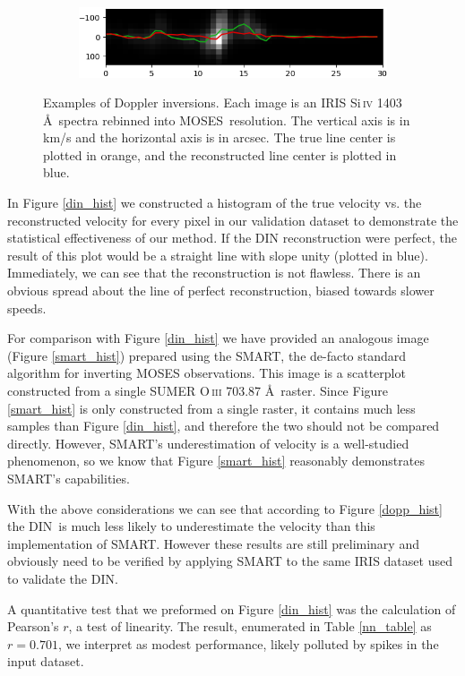 \documentclass[10pt,letterpaper]{article}
\newcommand{\SiIV}{Si\,\textsc{iv} 1403 \AA}
\newcommand{\MOSES}{\ac{MOSES}}
\newcommand{\SMART}{\ac{SMART}}
\newcommand{\DIN}{\ac{DIN}}
\begin{document}
\begin{figure}[h!]
\begin{subfigure}[t]{0.49\textwidth}
						\centering
						\includegraphics[width=\textwidth]{fig/doppler_1343}
					\end{subfigure}
					\caption{Examples of Doppler inversions. Each image is an IRIS \SiIV\ spectra rebinned into \MOSES\ resolution. The vertical axis is in km/s and the horizontal axis is in arcsec. The true line center is plotted in orange, and the reconstructed line center is plotted in blue.}
					\label{dopp_ex}
				\end{figure}

				In Figure \ref{din_hist} we constructed a histogram of the true velocity vs. the reconstructed velocity for every pixel in our validation dataset to demonstrate the statistical effectiveness of our method.
				If the DIN reconstruction were perfect, the result of this plot would be a straight line with slope unity (plotted in blue).
				Immediately, we can see that the reconstruction is not flawless. 
				There is an obvious spread about the line of perfect reconstruction, biased towards slower speeds.
				
				For comparison with Figure \ref{din_hist} we have provided an analogous image (Figure \ref{smart_hist}) prepared using the \SMART, the de-facto standard algorithm for inverting MOSES observations.
				This image is a scatterplot constructed from a single SUMER O\,\textsc{iii} 703.87 \AA\ raster.
				Since Figure \ref{smart_hist} is only constructed from a single raster, it contains much less samples than Figure \ref{din_hist}, and therefore the two should not be compared directly.
				However, SMART's underestimation of velocity is a well-studied phenomenon, so we know that Figure \ref{smart_hist} reasonably demonstrates SMART's capabilities.
				
				With the above considerations we can see that according to Figure \ref{dopp_hist} the \DIN\ is much less likely to underestimate the velocity than this implementation of SMART.
				However these results are still preliminary and obviously need to be verified by applying SMART to the same IRIS dataset used to validate the DIN.
				
				A quantitative test that we preformed on Figure \ref{din_hist} was the calculation of Pearson's $r$, a test of linearity.
				The result, enumerated in Table \ref{nn_table} as $r = 0.701$, we interpret as modest performance, likely polluted by spikes in the input dataset.
			
\end{document}
